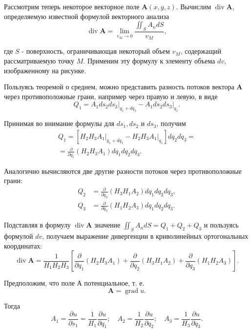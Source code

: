Рассмотрим теперь некоторое векторное поле $\mathbf{A}(x, y, z)$. Вычислим $\operatorname{div} \mathbf{A}$, определяемую известной формулой векторного анализа
\[
\operatorname{div} \mathbf{A}=\lim _{v_{M} \rightarrow 0} \frac{\iint_{S} A_{n} d S}{v_{M}},
\]

где $S$ - поверхность, ограничивающая некоторый объем $v_{M}$, содержащий рассматриваемую точку $M$. Применим эту формулу к элементу объема $d v$, изображенному на рисунке.

Пользуясь теоремой о среднем, можно представить разность потоков вектора $\mathbf{A}$ через противоположные грани, например через правую и левую, в виде
\[
Q_{1}=\left.A_{1} d s_{2} d s_{3}\right|_{q_{1}+d q_{1}}-\left.A_{1} d s_{2} d s_{3}\right|_{q_{1}} .
\]

Принимая во внимание формулы для $ds_1, ds_2$ и $ds_3$, получим
\[
\begin{aligned}
	Q_{1}=\left[\left.H_{2} H_{3} A_{1}\right|_{q_{1}+d q_{1}}-\left.H_{2} H_{3} A_{1}\right|_{q_{1}}\right] d q_{2} d q_{3}= \\
	=\frac{\partial}{\partial q_{1}}\left(H_{2} H_{3} A_{1}\right) d q_{1} d q_{2} d q_{3} .
\end{aligned}
\]

Аналогично вычисляются две другие разности потоков через противоположные грани:
\[
\begin{aligned}
	Q_{2} & =\frac{\partial}{\partial q_{2}}\left(H_{3} H_{1} A_{2}\right) d q_{1} d q_{2} d q_{3}, \\
	Q_{3} & =\frac{\partial}{\partial q_{3}}\left(H_{1} H_{2} A_{3}\right) d q_{1} d q_{2} d q_{3} .
\end{aligned}
\]

Подставляя в формулу $\operatorname{div} \mathbf{A}$ значение $\iint_{S} A_{n} d S=Q_{1}+Q_{2}+Q_{3}$ и пользуясь формулой $dv$, получаем выражение дивергенции в криволинейных ортогональных координатах:
\[
\operatorname{div} \mathbf{A}=\frac{1}{H_{1} H_{2} H_{3}}\left[\frac{\partial}{\partial q_{1}}\left(H_{2} H_{3} A_{1}\right)+\frac{\partial}{\partial q_{2}}\left(H_{3} H_{1} A_{2}\right)+\frac{\partial}{\partial q_{3}}\left(H_{1} H_{2} A_{3}\right)\right] .
\]

Предположим, что поле А потенциальное, т. е.
\[
\mathbf{A}=\operatorname{grad} u .
\]

Тогда
\[
A_{1}=\frac{\partial u}{\partial s_{1}}=\frac{1}{H_{1}} \frac{\partial u}{\partial q_{1}} ; \quad A_{2}=\frac{1}{H_{2}} \frac{\partial u}{\partial q_{2}} ; \quad A_{3}=\frac{1}{H_{3}} \frac{\partial u}{\partial q_{3}} .
\]

